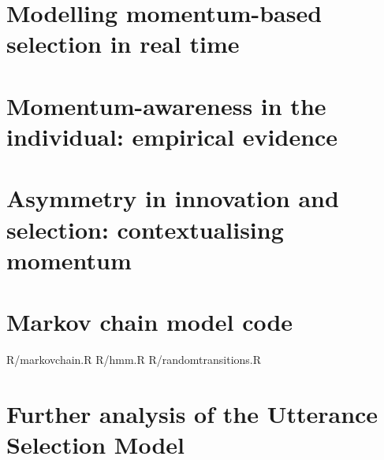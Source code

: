 \documentclass[oneside]{book}
\newcommand{\includeR}[1]{#1}
\begin{document}
\chapter[Modelling momentum-based selection]{Modelling momentum-based selection in real time}
\label{ch:momentummodel}


\chapter[Momentum-awareness in the individual]{Momentum-awareness in the individual: empirical evidence}
\label{ch:questionnaire}


\chapter[Asymmetry in innovation and selection]{Asymmetry in innovation and selection: contextualising momentum}
\label{ch:bigpicture}


%



\newpage
{}
\printindex

\appendix
%

\chapter{Markov chain model code}
\label{app:markovmodel}
\includeR{R/markovchain.R}
\includeR{R/hmm.R}
\includeR{R/randomtransitions.R}

\chapter[Further analysis of the USM]{Further analysis of the Utterance Selection Model}
\label{app:math}
\end{document}

